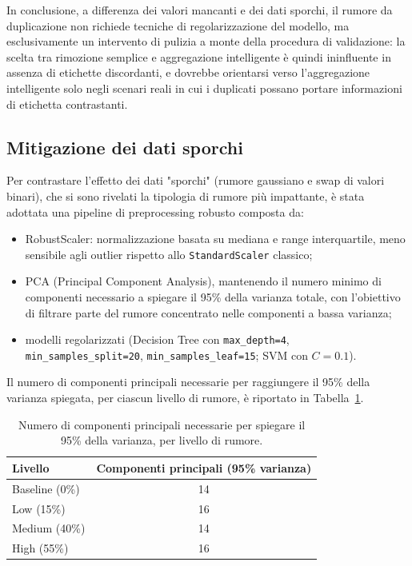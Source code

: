 \documentclass[12pt]{article}
\begin{document}
In conclusione, a differenza dei valori mancanti e dei dati sporchi, il rumore da duplicazione non richiede tecniche di regolarizzazione del modello, ma esclusivamente un intervento di pulizia a monte della procedura di validazione: la scelta tra rimozione semplice e aggregazione intelligente è quindi ininfluente in assenza di etichette discordanti, e dovrebbe orientarsi verso l'aggregazione intelligente solo negli scenari reali in cui i duplicati possano portare informazioni di etichetta contrastanti.




















\subsection{Mitigazione dei dati sporchi}

Per contrastare l'effetto dei dati "sporchi" (rumore gaussiano e swap di valori binari), che si sono rivelati la tipologia di rumore più impattante, è stata adottata una pipeline di preprocessing robusto composta da:

\begin{itemize}
    \item RobustScaler: normalizzazione basata su mediana e range interquartile, meno sensibile agli outlier rispetto allo \texttt{StandardScaler} classico;
    \item PCA (Principal Component Analysis), mantenendo il numero minimo di componenti necessario a spiegare il 95\% della varianza totale, con l'obiettivo di filtrare parte del rumore concentrato nelle componenti a bassa varianza;
    \item modelli regolarizzati (Decision Tree con \texttt{max\_depth=4}, \texttt{min\_samples\_split=20}, \texttt{min\_samples\_leaf=15}; SVM con $C=0.1$).
\end{itemize}

Il numero di componenti principali necessarie per raggiungere il 95\% della varianza spiegata, per ciascun livello di rumore, è riportato in Tabella~\ref{tab:pca_components}.

\begin{table}[H]
\centering
\begin{tabular}{lc}
\toprule
\textbf{Livello} & \textbf{Componenti principali (95\% varianza)} \\
\midrule
Baseline (0\%) & 14 \\
Low (15\%) & 16 \\
Medium (40\%) & 14 \\
High (55\%) & 16 \\
\bottomrule
\end{tabular}
\caption{Numero di componenti principali necessarie per spiegare il 95\% della varianza, per livello di rumore.}
\label{tab:pca_components}
\end{table}
\end{document}
